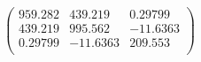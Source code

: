 \documentclass{article}
\begin{document}
\[\left(
\begin{array}{ccc}
 959.282 & 439.219 & 0.29799 \\
 439.219 & 995.562 & -11.6363 \\
 0.29799 & -11.6363 & 209.553 \\
\end{array}
\right)\]
\end{document}
